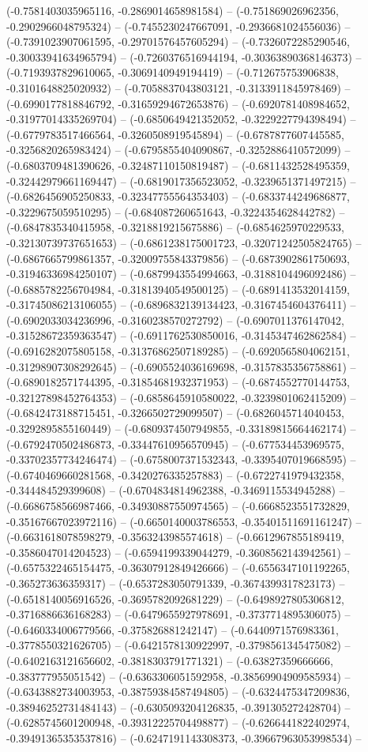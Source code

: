 (-0.7581403035965116, -0.2869014658981584) -- (-0.751869026962356, -0.2902966048795324) -- (-0.7455230247667091, -0.2936681024556036) -- (-0.7391023907061595, -0.29701576457605294) -- (-0.7326072285290546, -0.30033941634965794) -- (-0.7260376516944194, -0.30363890368146373) -- (-0.7193937829610065, -0.3069140949194419) -- (-0.712675753906838, -0.3101648825020932) -- (-0.7058837043803121, -0.3133911845978469) -- (-0.6990177818846792, -0.31659294672653876) -- (-0.6920781408984652, -0.31977014335269704) -- (-0.6850649421352052, -0.3229227794398494) -- (-0.6779783517466564, -0.3260508919545894) -- (-0.6787877607445585, -0.3256820265983424) -- (-0.6795855404090867, -0.3252886410572099) -- (-0.6803709481390626, -0.32487110150819487) -- (-0.6811432528495359, -0.32442979661169447) -- (-0.6819017356523052, -0.3239651371497215) -- (-0.6826456905250833, -0.32347755564353403) -- (-0.6833744249686877, -0.3229675059510295) -- (-0.684087260651643, -0.3224354628442782) -- (-0.6847835340415958, -0.3218819215675886) -- (-0.6854625970229533, -0.32130739737651653) -- (-0.6861238175001723, -0.32071242505824765) -- (-0.6867665799861357, -0.32009755843379856) -- (-0.6873902861750693, -0.31946336984250107) -- (-0.6879943554994663, -0.3188104496092486) -- (-0.6885782256704984, -0.31813940549500125) -- (-0.6891413532014159, -0.31745086213106055) -- (-0.6896832139134423, -0.3167454604376411) -- (-0.6902033034236996, -0.3160238570272792) -- (-0.6907011376147042, -0.31528672359363547) -- (-0.6911762530850016, -0.3145347462862584) -- (-0.6916282075805158, -0.31376862507189285) -- (-0.6920565804062151, -0.31298907308292645) -- (-0.6905524036169698, -0.3157835356758861) -- (-0.6890182571744395, -0.31854681932371953) -- (-0.6874552770144753, -0.32127898452764353) -- (-0.6858645910580022, -0.3239801062415209) -- (-0.6842473188715451, -0.3266502729099507) -- (-0.6826045714040453, -0.3292895855160449) -- (-0.6809374507949855, -0.33189815664462174) -- (-0.6792470502486873, -0.33447610956570945) -- (-0.677534453969575, -0.33702357734246474) -- (-0.6758007371532343, -0.3395407019668595) -- (-0.6740469660281568, -0.3420276335257883) -- (-0.6722741979432358, -0.344484529399608) -- (-0.6704834814962388, -0.3469115534945288) -- (-0.6686758566987466, -0.34930887550974565) -- (-0.6668523551732829, -0.35167667023972116) -- (-0.6650140003786553, -0.35401511691161247) -- (-0.6631618078598279, -0.3563243985574618) -- (-0.6612967855189419, -0.3586047014204523) -- (-0.6594199339044279, -0.3608562143942561) -- (-0.6575322465154475, -0.36307912849426666) -- (-0.6556347101192265, -0.365273636359317) -- (-0.6537283050791339, -0.3674399317823173) -- (-0.6518140056916526, -0.3695782092681229) -- (-0.6498927805306812, -0.3716886636168283) -- (-0.6479655927978691, -0.3737714895306075) -- (-0.6460334006779566, -0.375826881242147) -- (-0.6440971576983361, -0.3778550321626705) -- (-0.6421578130922997, -0.3798561345475082) -- (-0.6402163121656602, -0.3818303791771321) -- (-0.63827359666666, -0.383777955051542) -- (-0.6363306051592958, -0.38569904909585934) -- (-0.6343882734003953, -0.38759384587494805) -- (-0.6324475347209836, -0.38946252731484143) -- (-0.6305093204126835, -0.391305272428704) -- (-0.6285745601200948, -0.39312225704498877) -- (-0.6266441822402974, -0.39491365353537816) -- (-0.6247191143308373, -0.39667963053998534) -- 